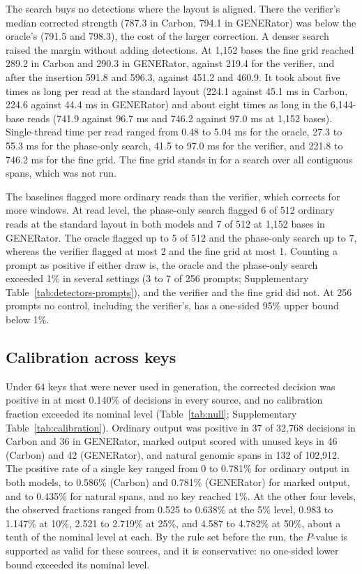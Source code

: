 \documentclass[10pt,twocolumn]{article}
\begin{document}
The search buys no detections where the layout is aligned. There the verifier's median corrected
strength (787.3 in Carbon, 794.1 in GENERator) was below the oracle's (791.5 and 798.3), the cost of
the larger correction. A denser search raised the margin without adding detections. At 1{,}152 bases
the fine grid reached 289.2 in Carbon and 290.3 in GENERator, against 219.4 for the verifier, and
after the insertion 591.8 and 596.3, against 451.2 and 460.9. It took about five times as long per
read at the standard layout (224.1 against 45.1 ms in Carbon, 224.6 against 44.4 ms in GENERator) and
about eight times as long in the 6{,}144-base reads (741.9 against 96.7 ms and 746.2 against 97.0 ms
at 1{,}152 bases). Single-thread time per read ranged from 0.48 to 5.04 ms for the oracle, 27.3 to
55.3 ms for the phase-only search, 41.5 to 97.0 ms for the verifier, and 221.8 to 746.2 ms for the
fine grid. The fine grid stands in for a search over all contiguous spans, which was not run.

The baselines flagged more ordinary reads than the verifier, which corrects for more windows. At read level, the phase-only search flagged 6 of 512 ordinary reads
at the standard layout in both models and 7 of 512 at 1{,}152 bases in GENERator. The oracle flagged
up to 5 of 512 and the phase-only search up to 7, whereas the verifier flagged at most 2 and the fine
grid at most 1. Counting a prompt as positive if either draw is, the oracle and the phase-only search
exceeded 1\% in several settings (3 to 7 of 256 prompts; Supplementary
Table~\ref{tab:detectors-prompts}), and the verifier and the fine grid did not. At 256 prompts no control, including the verifier's,
has a one-sided 95\% upper bound below 1\%.

\subsection{Calibration across keys}
\label{sec:null-keys}

Under 64 keys that were never used in generation, the corrected decision was positive in at most
0.140\% of decisions in every source, and no calibration fraction exceeded its nominal level
(Table~\ref{tab:null}; Supplementary Table~\ref{tab:calibration}). Ordinary output was positive in
37 of 32{,}768 decisions in Carbon and 36 in GENERator, marked output scored with unused keys in 46
(Carbon) and 42 (GENERator), and natural genomic spans in 132 of 102{,}912. The positive rate of a single key ranged from 0
to 0.781\% for ordinary output in both models, to 0.586\% (Carbon) and 0.781\% (GENERator) for marked
output, and to 0.435\% for natural spans, and no key reached 1\%. At the other four levels, the
observed fractions ranged from 0.525 to 0.638\% at the 5\% level, 0.983 to 1.147\% at 10\%, 2.521
to 2.719\% at 25\%, and 4.587 to 4.782\% at 50\%, about a tenth of the nominal level at each. By the
rule set before the run, the $P$-value is supported as valid for these sources, and it is
conservative: no one-sided lower bound exceeded its nominal level.
\end{document}
